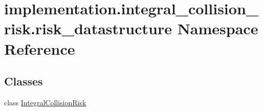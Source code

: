 \hypertarget{namespaceimplementation_1_1integral__collision__risk_1_1risk__datastructure}{}\section{implementation.\+integral\+\_\+collision\+\_\+risk.\+risk\+\_\+datastructure Namespace Reference}
\label{namespaceimplementation_1_1integral__collision__risk_1_1risk__datastructure}
\subsection*{Classes}
\begin{DoxyCompactItemize}
\item 
class \hyperlink{classimplementation_1_1integral__collision__risk_1_1risk__datastructure_1_1_integral_collision_risk}{Integral\+Collision\+Risk}
\end{DoxyCompactItemize}

